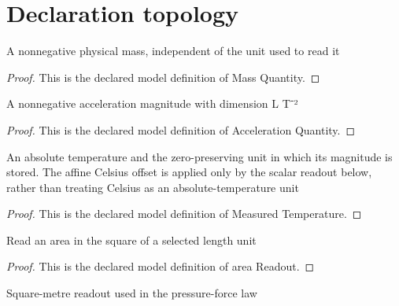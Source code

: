 \section{Declaration topology}
\begin{definition}
  \label{def:physics:phyx-mini-0440:phyxminiproblems-problemphyxmini0440-massquantity}
  A nonnegative physical mass, independent of the unit used to read it
\end{definition}
\begin{proof}
  This is the declared model definition of Mass Quantity.
\end{proof}
\begin{definition}
  \label{def:physics:phyx-mini-0440:phyxminiproblems-problemphyxmini0440-accelerationquantity}
  A nonnegative acceleration magnitude with dimension L T⁻²
\end{definition}
\begin{proof}
  This is the declared model definition of Acceleration Quantity.
\end{proof}
\begin{definition}
  \label{def:physics:phyx-mini-0440:phyxminiproblems-problemphyxmini0440-measuredtemperature}
  An absolute temperature and the zero-preserving unit in which its magnitude is stored. The affine Celsius offset is applied only by the scalar readout below, rather than treating Celsius as an absolute-temperature unit
\end{definition}
\begin{proof}
  This is the declared model definition of Measured Temperature.
\end{proof}
\begin{definition}
  \label{def:physics:phyx-mini-0440:phyxminiproblems-problemphyxmini0440-areareadout}
  Read an area in the square of a selected length unit
\end{definition}
\begin{proof}
  This is the declared model definition of area Readout.
\end{proof}
\begin{definition}
  \label{def:physics:phyx-mini-0440:phyxminiproblems-problemphyxmini0440-areainsquaremeters}
  Square-metre readout used in the pressure-force law
\end{definition}
